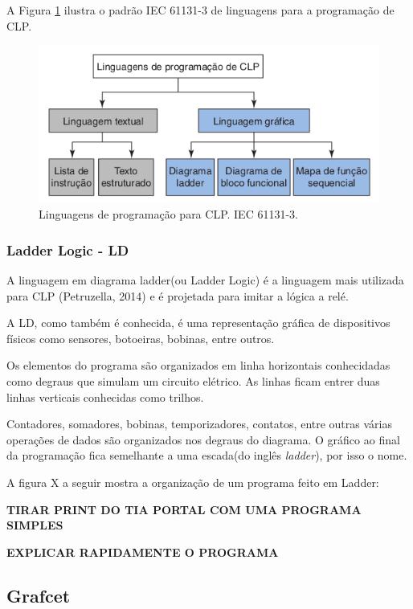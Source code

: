 \documentclass[a4paper, 12pt]{article}
\begin{document}
		A Figura \ref{fig:progam-language-clp} ilustra o padrão IEC 61131-3 de linguagens para a programação de CLP.

		\begin{figure}[H]
			\centering
			\includegraphics[scale=0.5]{figures/programming_language_for_CLP_IEC-61131-3.png}
			\caption{Linguagens de programação para CLP. IEC 61131-3.}
			\label{fig:progam-language-clp}
		\end{figure}
		
		\subsubsection{Ladder Logic - LD}
		
			A linguagem em diagrama ladder(ou Ladder Logic) é a linguagem mais utilizada para CLP (Petruzella, 2014)
			e é projetada para imitar a lógica a relé.
		
			A LD, como também é conhecida, é uma representação gráfica de dispositivos físicos
			como sensores, botoeiras, bobinas, entre outros.
			
			Os elementos do programa são organizados em linha horizontais conhecidadas como
			degraus que simulam um circuito elétrico. As linhas ficam entrer duas linhas
			verticais conhecidas como trilhos.
			
			Contadores, somadores, bobinas, temporizadores, contatos, entre outras várias
			operações de dados são organizados nos degraus do diagrama.
			O gráfico ao final da programação fica semelhante a uma escada(do inglês \textit{ladder}), por isso o nome.
			
			A figura X a seguir mostra a organização de um programa feito em Ladder:
			
			\textbf{TIRAR PRINT DO TIA PORTAL COM UMA PROGRAMA SIMPLES}
			
			\textbf{EXPLICAR RAPIDAMENTE O PROGRAMA}

	\subsection{Grafcet}
\end{document}
